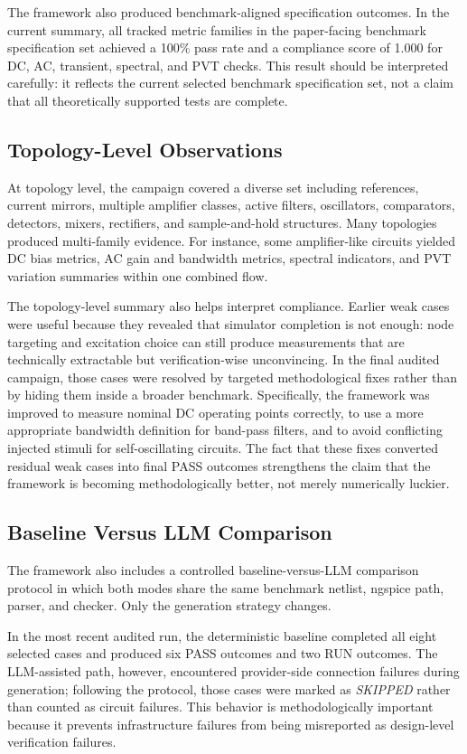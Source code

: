 \documentclass[conference]{IEEEtran}
\begin{document}
The framework also produced benchmark-aligned specification outcomes. In the current summary, all tracked metric families in the paper-facing benchmark specification set achieved a 100\% pass rate and a compliance score of 1.000 for DC, AC, transient, spectral, and PVT checks. This result should be interpreted carefully: it reflects the current selected benchmark specification set, not a claim that all theoretically supported tests are complete.

\subsection{Topology-Level Observations}
At topology level, the campaign covered a diverse set including references, current mirrors, multiple amplifier classes, active filters, oscillators, comparators, detectors, mixers, rectifiers, and sample-and-hold structures. Many topologies produced multi-family evidence. For instance, some amplifier-like circuits yielded DC bias metrics, AC gain and bandwidth metrics, spectral indicators, and PVT variation summaries within one combined flow.

The topology-level summary also helps interpret compliance. Earlier weak cases were useful because they revealed that simulator completion is not enough: node targeting and excitation choice can still produce measurements that are technically extractable but verification-wise unconvincing. In the final audited campaign, those cases were resolved by targeted methodological fixes rather than by hiding them inside a broader benchmark. Specifically, the framework was improved to measure nominal DC operating points correctly, to use a more appropriate bandwidth definition for band-pass filters, and to avoid conflicting injected stimuli for self-oscillating circuits. The fact that these fixes converted residual weak cases into final PASS outcomes strengthens the claim that the framework is becoming methodologically better, not merely numerically luckier.

\subsection{Baseline Versus LLM Comparison}
The framework also includes a controlled baseline-versus-LLM comparison protocol in which both modes share the same benchmark netlist, ngspice path, parser, and checker. Only the generation strategy changes.

In the most recent audited run, the deterministic baseline completed all eight selected cases and produced six PASS outcomes and two RUN outcomes. The LLM-assisted path, however, encountered provider-side connection failures during generation; following the protocol, those cases were marked as \emph{SKIPPED} rather than counted as circuit failures. This behavior is methodologically important because it prevents infrastructure failures from being misreported as design-level verification failures.
\end{document}
